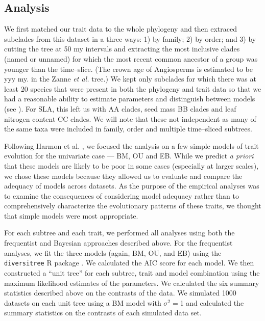 \documentclass[a4paper,12pt]{article}
\begin{document}
\subsection{Analysis}

We first matched our trait data to the whole phylogeny and then extraced subclades from this dataset in a three ways: 1) by family; 2) by order; and 3) by cutting the tree at 50 my intervals and extracting the most inclusive clades (named or unnamed) for which the most recent common ancestor of a group was younger than the time--slice. (The crown age of Angiosperms is estimated to be yyy my. in the Zanne \textit{et al.} tree.) We kept only subclades for which there was at least 20 species that were present in both the phylogeny and trait data so that we had a reasonable ability to estimate parameters and distinguish between models (see \citep{Boettiger2012, SlaterPennell}). For SLA, this left us with AA clades, seed mass BB clades and leaf nitrogen content CC clades. We will note that these not independent as many of the same taxa were included in family, order and multiple time--sliced subtrees. 

Following Harmon et al. \citep{Harmon2010}, we focused the analysis on a few simple models of trait evolution for the univariate case --- BM, OU and EB. While we predict \textit{a priori} that these models are likely to be poor in some cases (especially at larger scales), we chose these models because they allowed us to evaluate and compare the adequacy of models across datasets. As the purpose of the empirical analyses was to examine the consequences of considering model adequacy rather than to comprehensively characterize the evolutionary patterns of these traits, we thought that simple models were most appropriate.

For each subtree and each trait, we performed all analyses using both the frequentist and Bayesian approaches described above. For the frequentist analyses, we fit the three models (again, BM, OU, and EB) using the \texttt{diversitree} R package \citep{FitzJohn2012}. We calculated the AIC \citep{Akaike1974} score for each model. We then constructed a ``unit tree'' for each subtree, trait and model combination using the maximum likelihood estimates of the parameters. We calculated the six summary statistics described above on the contrasts of the data. We simulated 1000 datasets on each unit tree using a BM model with $\sigma^2=$1 and calculated the summary statistics on the contrasts of each simulated data set. 
\end{document}
